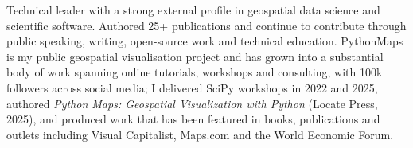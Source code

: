 \begin{cvparagraph}
Technical leader with a strong external profile in geospatial data science and scientific software. Authored 25+ publications and continue to contribute through public speaking, writing, open-source work and technical education. PythonMaps is my public geospatial visualisation project and has grown into a substantial body of work spanning online tutorials, workshops and consulting, with 100k followers across social media; I delivered SciPy workshops in 2022 and 2025, authored \emph{Python Maps: Geospatial Visualization with Python} (Locate Press, 2025), and produced work that has been featured in books, publications and outlets including Visual Capitalist, Maps.com and the World Economic Forum.
\end{cvparagraph}
